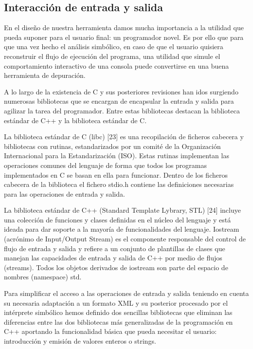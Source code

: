 \subsection{Interacci\'on de entrada y salida}

En el dise\~no de nuestra herramienta damos mucha importancia a la utilidad que pueda suponer para el usuario final: un programador novel. Es por ello que para que una vez hecho el an\'alisis simb\'olico, en caso de que el usuario quisiera reconstruir el flujo de ejecuci\'on del programa, una utilidad que simule el comportamiento interactivo de una consola puede convertirse en una buena herramienta de depuraci\'on.

A lo largo de la existencia de C y sus posteriores revisiones han idos surgiendo numerosas bibliotecas que se encargan de encapsular la entrada y salida para agilizar la tarea del programador. Entre estas bibliotecas destacan la biblioteca est\'andar de C++ y la biblioteca est\'andar de C.

La biblioteca est\'andar de C (libc) [23] es una recopilaci\'on de ficheros cabecera y bibliotecas con rutinas, estandarizados por un comit\'e de la Organizaci\'on Internacional para la Estandarizaci\'on (ISO). Estas rutinas implementan las operaciones comunes del lenguaje de forma que todos los programas implementados en C se basan en ella para funcionar. Dentro de los ficheros cabecera de la biblioteca el fichero stdio.h contiene las definiciones necesarias para las operaciones de entrada y salida.

La biblioteca est\'andar de C++ (Standard Template Lybrary, STL) [24] incluye una colecci\'on de funciones y clases definidas en el n\'ucleo del lenguaje y est\'a ideada para dar soporte a la mayor\'ia de funcionalidades del lenguaje. Iostream (acr\'onimo de Input/Output Stream) es el componente responsable del control de flujo de entrada y salida y refiere a un conjunto de plantillas de clases que manejan las capacidades de entrada y salida de C++ por medio de flujos (streams). Todos los objetos derivados de iostream son parte del espacio de nombres (namespace) std.

Para simplificar el acceso a las operaciones de entrada y salida teniendo en cuenta su necesaria adaptaci\'on a un formato XML y su posterior procesado por el int\'erprete simb\'olico hemos definido dos sencillas bibliotecas que eliminan las diferencias entre las dos bibliotecas m\'as generalizadas de la programaci\'on en C++ aportando la funcionalidad b\'asica que pueda necesitar el usuario: introducci\'on y emisi\'on de valores enteros o strings.

